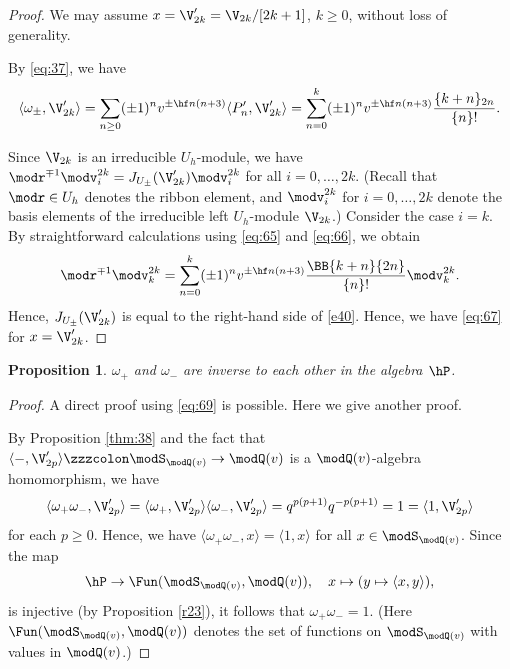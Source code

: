 \documentclass{amsart}
\numberwithin{equation}{section}
\numberwithin{figure}{section}
\theoremstyle{plain}
\newtheorem{proposition}[theorem]{Proposition}
\theoremstyle{definition}
\theoremstyle{remark}
\begin{document}
\begin{proof}
  We may assume $x=\V'_{2k}=\V_{2k}/[2k+1]$, $k\ge 0$, without loss of
  generality.

  By \eqref{eq:37}, we have
  \begin{equation}
    \label{e40}
      \langle \omega _\pm ,\V'_{2k}\rangle 
      =\sum_{n\ge 0}(\pm 1)^nv^{\pm \hf n(n+3)}\langle P'_n,\V'_{2k}\rangle 
      =\sum_{n=0}^k (\pm 1)^nv^{\pm \hf n(n+3)}\frac{\{k+n\}_{2n}}{\{n\}!}.
  \end{equation}

  Since $\V_{2k}$ is an irreducible $U_h$-module, we have
  $\modr ^{\mp1}\modv _i^{2k}=J_{U_\pm }(\V'_{2k})\modv _i^{2k}$ for all
  $i=0,\ldots,2k$.
  (Recall that $\modr \in U_h$ denotes the ribbon element, and $\modv ^{2k}_i$
  for $i=0,\ldots,2k$ denote the basis elements of the irreducible left
  $U_h$-module $\V_{2k}$.)  Consider the case $i=k$.
  By straightforward calculations using \eqref{eq:65} and
  \eqref{eq:66}, we obtain
  \begin{equation*}
    \modr ^{\mp1}\modv ^{2k}_k
    =\sum_{n=0}^k(\pm 1)^nv^{\pm \hf n(n+3)}\frac{\BB{k+n}{2n}}{\{n\}!}\modv ^{2k}_k.
  \end{equation*}
  Hence, $J_{U_\pm }(\V'_{2k})$ is equal to the right-hand side of \eqref{e40}.
  Hence, we have \eqref{eq:67} for $x=\V'_{2k}$.
\end{proof}

\begin{proposition}
  \label{thm:42}
  $\omega _+$ and $\omega _-$ are inverse to each other in the algebra $\hP$.
\end{proposition}

\begin{proof}
  A direct proof using \eqref{eq:69} is possible.  Here we give
  another proof.

  By Proposition \ref{thm:38} and the fact that
  $\langle -,\V'_{2p}\rangle \zzzcolon \modS _{\modQ (v)}\rightarrow \modQ (v)$ is a $\modQ (v)$-algebra
  homomorphism, we have
  \begin{equation*}
    \langle \omega _+\omega _-,\V'_{2p}\rangle 
    =\langle \omega _+,\V'_{2p}\rangle \langle \omega _-,\V'_{2p}\rangle 
    =q^{p(p+1)}q^{-p(p+1)}
    =1=\langle 1,\V'_{2p}\rangle 
  \end{equation*}
  for each $p\ge 0$.  Hence, we have $\langle \omega _+\omega _-,x\rangle =\langle 1,x\rangle $ for all
  $x\in \modS _{\modQ (v)}$.  Since the map
  \begin{equation*}
    \hP \rightarrow \Fun(\modS _{\modQ (v)},\modQ (v)),\quad x\mapsto (y\mapsto \langle x,y\rangle ),
  \end{equation*}
  is injective (by Proposition \ref{r23}), it follows that
  $\omega _+\omega _-=1$.  (Here $\Fun(\modS _{\modQ (v)},\modQ (v))$ denotes the set of
  functions on $\modS _{\modQ (v)}$ with values in $\modQ (v)$.)
\end{proof}
\end{document}
